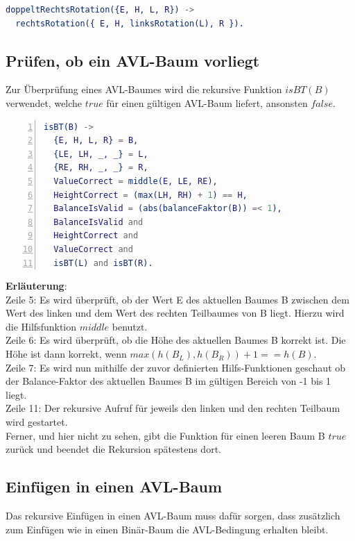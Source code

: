 \documentclass{article}
\begin{document}
\begin{lstlisting}[language=erlang]
doppeltRechtsRotation({E, H, L, R}) ->
  rechtsRotation({ E, H, linksRotation(L), R }).
\end{lstlisting}
	
	\subsection{Prüfen, ob ein AVL-Baum vorliegt}
	
	Zur Überprüfung eines AVL-Baumes wird die rekursive Funktion $isBT(B)$ verwendet, welche $true$ für einen gültigen AVL-Baum liefert, ansonsten $false$.
	
\begin{lstlisting}[language=erlang,numbers=left]
isBT(B) ->
  {E, H, L, R} = B,
  {LE, LH, _, _} = L,
  {RE, RH, _, _} = R,
  ValueCorrect = middle(E, LE, RE),
  HeightCorrect = (max(LH, RH) + 1) == H,
  BalanceIsValid = (abs(balanceFaktor(B)) =< 1),
  BalanceIsValid and
  HeightCorrect and 
  ValueCorrect and 
  isBT(L) and isBT(R).
\end{lstlisting}
	
	\textbf{Erläuterung}: \\
	Zeile 5: Es wird überprüft, ob der Wert E des aktuellen Baumes B zwischen dem Wert des linken und dem Wert des rechten Teilbaumes von B liegt. Hierzu wird die Hilfsfunktion $middle$ benutzt.\\
	Zeile 6: Es wird überprüft, ob die Höhe des aktuellen Baumes B korrekt ist. Die Höhe ist dann korrekt, wenn $max(h(B_L), h(B_R)) + 1 == h(B)$.\\
	Zeile 7: Es wird nun mithilfe der zuvor definierten Hilfs-Funktionen geschaut ob der Balance-Faktor des aktuellen Baumes B im gültigen Bereich von -1 bis 1 liegt.\\
	Zeile 11: Der rekursive Aufruf für jeweils den linken und den rechten Teilbaum wird gestartet.\\
	Ferner, und hier nicht zu sehen, gibt die Funktion für einen leeren Baum B $true$ zurück und beendet die Rekursion spätestens dort.
	
	\newpage
	
	\subsection{Einfügen in einen AVL-Baum}
	
	Das rekursive Einfügen in einen AVL-Baum muss dafür sorgen, dass zusätzlich zum Einfügen wie in einen Binär-Baum die AVL-Bedingung erhalten bleibt.
\end{document}
